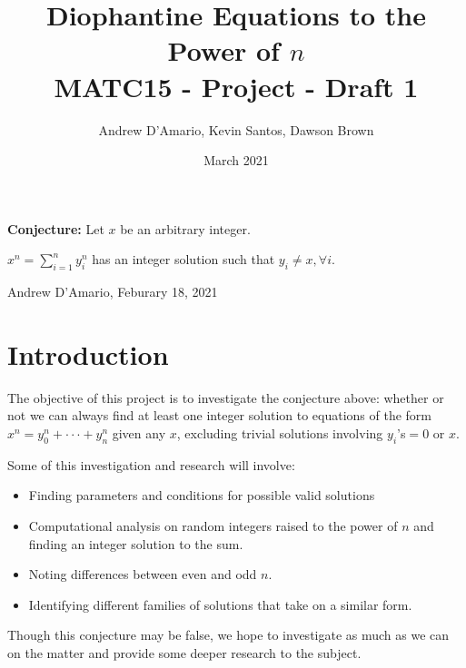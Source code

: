 \documentclass{article}
\title{Diophantine Equations to the Power of $n$ \\ \vspace{.3in} \large{MATC15 - Project - Draft 1}}
\author{Andrew D'Amario, Kevin Santos, Dawson Brown }
\date{March 2021}
\begin{document}
\maketitle

\begin{flushleft}
    {\bf Conjecture:} Let $x$ be an arbitrary integer.

    \hspace{.5in}$\displaystyle x^n=\sum^{n}_{i=1}y_i^n$ has an integer solution such that $y_i\ne x, \forall i$.

    \hspace{2in} Andrew D'Amario, Feburary 18, 2021
\end{flushleft}

\section{Introduction}
The objective of this project is to investigate the conjecture above: whether or not we can always find at least one integer solution to equations of the form $x^n=y_0^n+\cdot\cdot\cdot+y_n^n$ given any $x$, excluding trivial solutions involving $y_i$'s$=0$ or $x$. 

Some of this investigation and research will involve:
\begin{itemize}    
    \item Finding parameters and conditions for possible valid solutions
    \item Computational analysis on random integers raised to the power of $n$ and finding an integer solution to the sum.
    \item Noting differences between even and odd $n$.
    \item Identifying different families of solutions that take on a similar form.
\end{itemize}

Though this conjecture may be false, we hope to investigate as much as we can on the matter and provide some deeper research to the subject.



\end{document}

